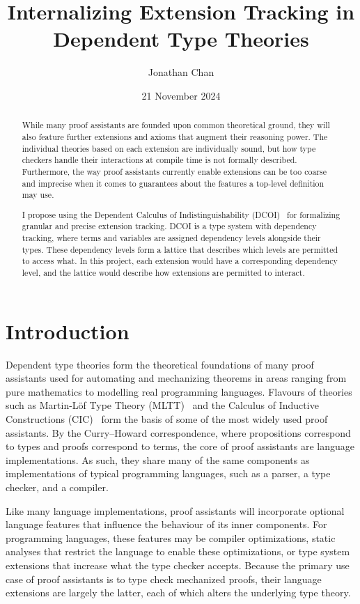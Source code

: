\documentclass{article}
\title{\textbf{Internalizing Extension Tracking in Dependent Type Theories}}
\author{Jonathan Chan}
\date{21 November 2024}
\begin{document}
\maketitle

\begin{abstract}
  While many proof assistants are founded upon common theoretical ground,
  they will also feature further extensions and axioms
  that augment their reasoning power.
  The individual theories based on each extension are individually sound,
  but how type checkers handle their interactions at compile time
  is not formally described.
  Furthermore, the way proof assistants currently enable extensions
  can be too coarse and imprecise when it comes to
  guarantees about the features a top-level definition may use.

  I propose using the Dependent Calculus of Indistinguishability (DCOI)~\citep{dcoi}
  for formalizing granular and precise extension tracking.
  DCOI is a type system with dependency tracking,
  where terms and variables are assigned dependency levels alongside their types.
  These dependency levels form a lattice that describes
  which levels are permitted to access what.
  In this project, each extension would have a corresponding dependency level,
  and the lattice would describe how extensions are permitted to interact.
\end{abstract}

\section{Introduction}

Dependent type theories form the theoretical foundations of many proof assistants
used for automating and mechanizing theorems in areas ranging from pure mathematics
to modelling real programming languages.
Flavours of theories such as Martin-L\"of Type Theory (MLTT)~\citep{mltt}
and the Calculus of Inductive Constructions (CIC)~\citep{cic}
form the basis of some of the most widely used proof assistants.
By the Curry--Howard correspondence,
where propositions correspond to types and proofs correspond to terms,
the core of proof assistants are language implementations.
As such, they share many of the same components
as implementations of typical programming languages,
such as a parser, a type checker, and a compiler.

Like many language implementations,
proof assistants will incorporate optional language features
that influence the behaviour of its inner components.
For programming languages, these features may be compiler optimizations,
static analyses that restrict the language to enable these optimizations,
or type system extensions that increase what the type checker accepts.
Because the primary use case of proof assistants is to type check mechanized proofs,
their language extensions are largely the latter,
each of which alters the underlying type theory.
\end{document}
